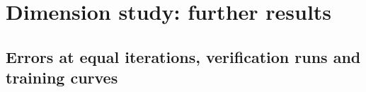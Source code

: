 \section{Dimension study: further results}\label{S5:sec}

\subsection{Errors at equal iterations, verification runs and training curves}\label{S5:sec:vdim}


